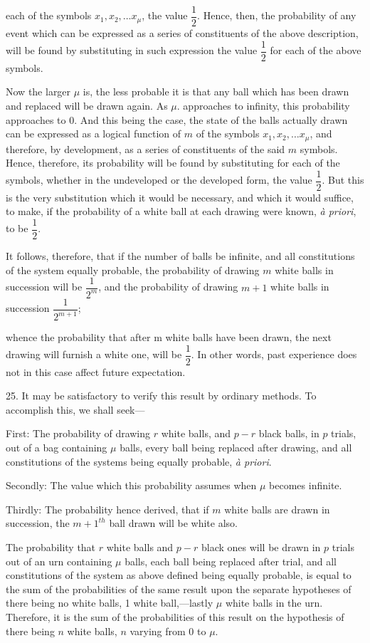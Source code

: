 \documentclass[oneside]{book}
\begin{document}
each of the symbols $x_1, x_2,\dotsc x_\mu$, the value $\dfrac{1}{2}$. Hence, then, the
probability of any event which can be expressed as a series of
constituents of the above description, will be found by substituting in such expression the value $\dfrac{1}{2}$ for each of the above
symbols.

Now the larger $\mu$ is, the less probable it is that any ball
which has been drawn and replaced will be drawn again. As $\mu$.
approaches to infinity, this probability approaches to $0$. And
this being the case, the state of the balls actually drawn can be
expressed as a logical function of $m$ of the symbols
$x_1, x_2,\dotsc x_\mu$,
and therefore, by development, as a series of constituents of the
said $m$ symbols. Hence, therefore, its probability will be found
by substituting for each of the symbols, whether in the undeveloped or the developed form, the value $\dfrac{1}{2}$. But this is the very
substitution which it would be necessary, and which it would
suffice, to make, if the probability of a white ball at each drawing
were known, \textit{\`{a} priori}, to be $\dfrac{1}{2}$.

It follows, therefore, that if the number of balls be infinite,
and all constitutions of the system equally probable, the probability of drawing $m$ white balls in succession will be $\dfrac{1}{2^m}$, and the
probability of drawing $m + 1$ white balls in succession $\dfrac{1}{2^{m+1}}$;

whence the probability that after m white balls have been drawn,
the next drawing will furnish a white one, will be $\dfrac{1}{2}$. In other
words, past experience does not in this case affect future expectation.

25. It may be satisfactory to verify this result by ordinary
methods. To accomplish this, we shall seek---

First: The probability of drawing $r$ white balls, and $p-r$
black balls, in $p$ trials, out of a bag containing $\mu$ balls, every ball
being replaced after drawing, and all constitutions of the systems
being equally probable, \textit{\`{a} priori}.

Secondly: The value which this probability assumes when
$\mu$ becomes infinite.

Thirdly: The probability hence derived, that if $m$ white
balls are drawn in succession, the ${m + 1}^{th}$ ball drawn will be
white also.

The probability that $r$ white balls and $p-r$ black ones will be
drawn in $p$ trials out of an urn containing $\mu$ balls, each ball
being replaced after trial, and all constitutions of the system as
above defined being equally probable, is equal to the sum of the
probabilities of the same result upon the separate hypotheses of
there being no white balls, 1 white ball,---lastly $\mu$ white balls in
the urn. Therefore, it is the sum of the probabilities of this result on the hypothesis of there being $n$ white balls, $n$ varying
from 0 to $\mu$.
\end{document}
